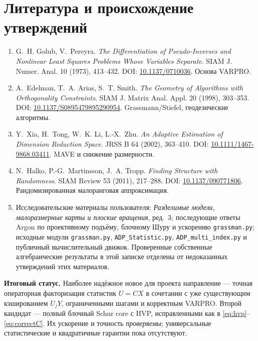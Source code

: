 \documentclass[10.5pt,a4paper]{article}
\numberwithin{equation}{section}
\theoremstyle{plain}
\theoremstyle{definition}
\begin{document}
\section*{Литература и происхождение утверждений}
\begin{sloppypar}
\begin{enumerate}[leftmargin=7mm,itemsep=4pt]
\item G.~H. Golub, V.~Pereyra. \emph{The Differentiation of Pseudo-Inverses and Nonlinear Least Squares Problems Whose Variables Separate}. SIAM J. Numer. Anal. 10 (1973), 413--432. DOI: \href{https://doi.org/10.1137/0710036}{10.1137/0710036}. Основа VARPRO.
\item A.~Edelman, T.~A. Arias, S.~T. Smith. \emph{The Geometry of Algorithms with Orthogonality Constraints}. SIAM J. Matrix Anal. Appl. 20 (1998), 303--353. DOI: \href{https://doi.org/10.1137/S0895479895290954}{10.1137/S0895479895290954}. Grassmann/Stiefel, геодезические алгоритмы.
\item Y.~Xia, H.~Tong, W.~K. Li, L.-X.~Zhu. \emph{An Adaptive Estimation of Dimension Reduction Space}. JRSS B 64 (2002), 363--410. DOI: \href{https://doi.org/10.1111/1467-9868.03411}{10.1111/1467-9868.03411}. MAVE и снижение размерности.
\item N.~Halko, P.-G.~Martinsson, J.~A. Tropp. \emph{Finding Structure with Randomness}. SIAM Review 53 (2011), 217--288. DOI: \href{https://doi.org/10.1137/090771806}{10.1137/090771806}. Рандомизированная малоранговая аппроксимация.
\item Исследовательские материалы пользователя: \emph{Разделимые модели, малоразмерные карты и плоские вращения}, ред.~3; последующие ответы Argon по проективному подъёму, блочному Шуру и ускорению \texttt{grassman.py}; исходные модули \texttt{grassman.py}, \texttt{ADP\_Statistic.py}, \texttt{ADP\_multi\_index.py} и публичный вычислительный движок. Проверенные собственные алгебраические результаты в этой записке отделены от недоказанных утверждений этих материалов.
\end{enumerate}
\end{sloppypar}

\begin{mainbox}
\textbf{Итоговый статус.} Наиболее надёжное новое для проекта направление --- точная операторная факторизация статистик $U=CX$ в сочетании с уже существующим кэшированием $U_jY$, ограниченными шагами и корректным VARPRO. Второй кандидат --- полный блочный Schur core с HVP, исправленными как в \eqref{eq:hvp}--\eqref{eq:correctC}. Их ускорение и точность \emph{проверяемы}; универсальные статистические и квадратичные гарантии пока отсутствуют.
\end{mainbox}
\end{document}
